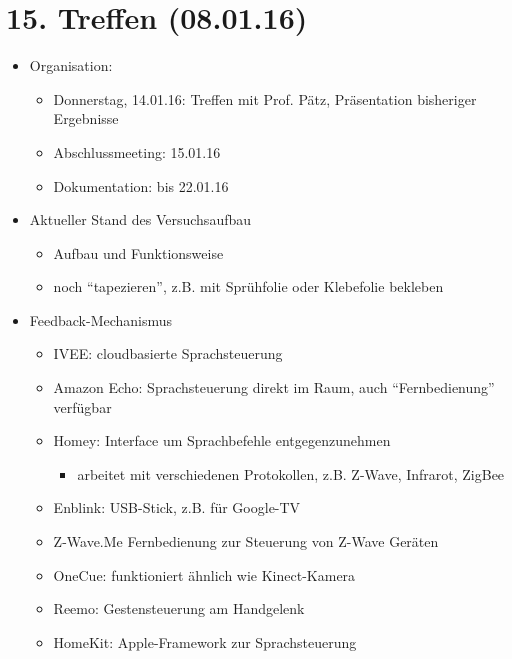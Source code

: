 \section{15. Treffen (08.01.16)}
\begin{itemize}
	\item Organisation:
	\begin{itemize}
		\item Donnerstag, 14.01.16: Treffen mit Prof. Pätz, Präsentation bisheriger Ergebnisse
		\item Abschlussmeeting: 15.01.16
		\item Dokumentation: bis 22.01.16
	\end{itemize}

	\item Aktueller Stand des Versuchsaufbau
	\begin{itemize}
		\item Aufbau und Funktionsweise
		\item noch "`tapezieren"', z.B. mit Sprühfolie oder Klebefolie bekleben
	\end{itemize}

	\item Feedback-Mechanismus
	\begin{itemize}
		\item IVEE: cloudbasierte Sprachsteuerung
		\item Amazon Echo: Sprachsteuerung direkt im Raum, auch "`Fernbedienung"' verfügbar
		\item Homey: Interface um Sprachbefehle entgegenzunehmen
		\begin{itemize}
			\item arbeitet mit verschiedenen Protokollen, z.B. Z-Wave, Infrarot, ZigBee
		\end{itemize}
		\item Enblink: USB-Stick, z.B. für Google-TV
		\item Z-Wave.Me Fernbedienung zur Steuerung von Z-Wave Geräten
		\item OneCue: funktioniert ähnlich wie Kinect-Kamera
		\item Reemo: Gestensteuerung am Handgelenk
		\item HomeKit: Apple-Framework zur Sprachsteuerung
	\end{itemize}


\end{itemize}
